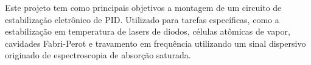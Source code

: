 Este projeto tem como principais objetivos a montagem de um circuito de estabilização eletrônico de PID. Utilizado para tarefas específicas, como a estabilização em temperatura de lasers de diodos, células atômicas de vapor, cavidades Fabri-Perot e travamento em frequência utilizando um sinal dispersivo originado de espectroscopia de absorção saturada.